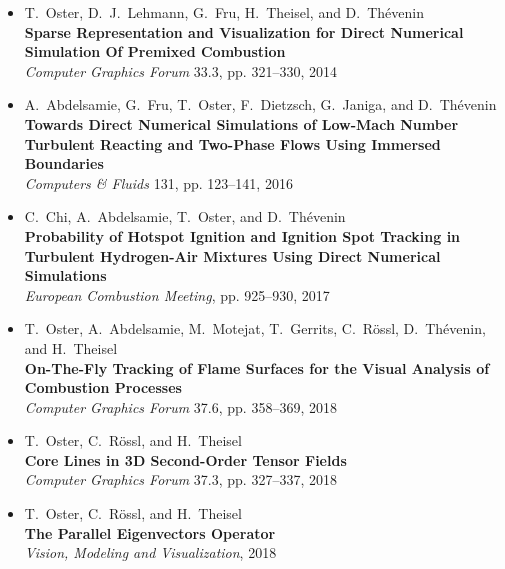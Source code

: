 %
\begin{itemize}[label={},leftmargin=0pt]
    \item T.~Oster, D.~J.~Lehmann, G.~Fru, H.~Theisel, and D.~Thévenin\\
        \textbf{Sparse Representation and Visualization for Direct Numerical
        Simulation Of Premixed Combustion}\\
        {\emph{Computer Graphics Forum} 33.3, pp. 321--330, 2014}

    \item A.~Abdelsamie, G.~Fru, T.~Oster, F.~Dietzsch, G.~Janiga,
        and D.~Thévenin\\
        \textbf{Towards Direct Numerical Simulations of Low-Mach Number
        Turbulent Reacting and Two-Phase Flows Using Immersed Boundaries}\\
        {\emph{Computers \& Fluids} 131, pp. 123--141, 2016}

    \item C.~Chi, A.~Abdelsamie, T.~Oster, and D.~Thévenin\\
        \textbf{Probability of Hotspot Ignition and Ignition Spot Tracking in
        Turbulent Hydrogen-Air Mixtures Using Direct Numerical Simulations}\\
        {\emph{ European Combustion Meeting}, pp. 925--930, 2017}

    \item T.~Oster, A.~Abdelsamie, M.~Motejat, T.~Gerrits, C.~Rössl,
        D.~Thévenin, and H.~Theisel\\
        \textbf{On-The-Fly Tracking of Flame Surfaces for the Visual Analysis
        of Combustion Processes}\\
        {\emph{Computer Graphics Forum} 37.6, pp. 358--369, 2018}

    \item T.~Oster, C.~Rössl, and H.~Theisel\\
        \textbf{Core Lines in \ac{3D} Second-Order Tensor Fields}\\
        {\emph{Computer Graphics Forum} 37.3, pp. 327--337, 2018}

    \item T.~Oster, C.~Rössl, and H.~Theisel\\
        \textbf{The Parallel Eigenvectors Operator}\\
        {\emph{Vision, Modeling and Visualization}, 2018}
\end{itemize}
\clearpage
%

